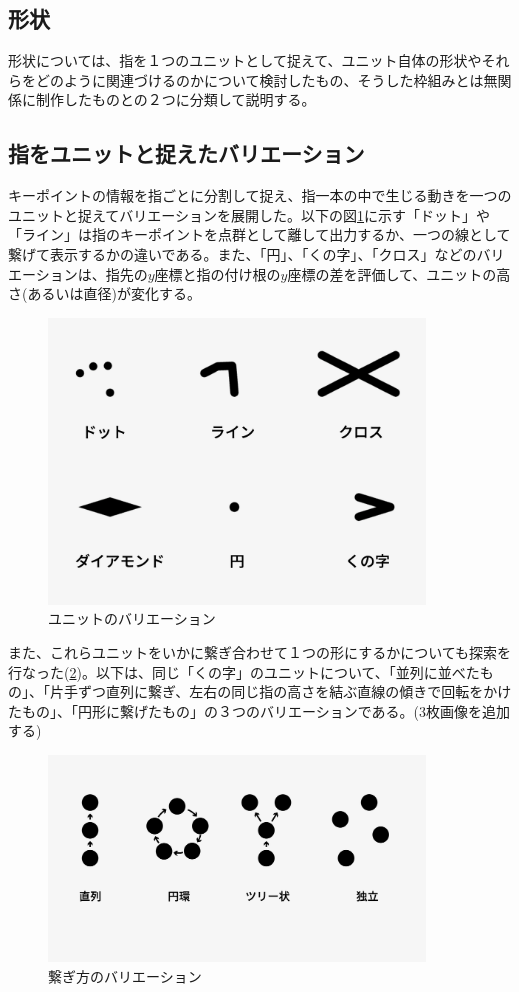 \subsection{形状}
形状については、指を１つのユニットとして捉えて、ユニット自体の形状やそれらをどのように関連づけるのかについて検討したもの、そうした枠組みとは無関係に制作したものとの２つに分類して説明する。
\subsection*{指をユニットと捉えたバリエーション}
キーポイントの情報を指ごとに分割して捉え、指一本の中で生じる動きを一つのユニットと捉えてバリエーションを展開した。以下の図\ref{fig:unit_valiation}に示す「ドット」や「ライン」は指のキーポイントを点群として離して出力するか、一つの線として繋げて表示するかの違いである。また、「円」、「くの字」、「クロス」などのバリエーションは、指先の\(y\)座標と指の付け根の\(y\)座標の差を評価して、ユニットの高さ(あるいは直径)が変化する。
\begin{figure}[H]
  \centering
  \includegraphics[width=10cm]{img/unit_valiation.png}
  \caption{ユニットのバリエーション}
  \label{fig:unit_valiation}
\end{figure}

また、これらユニットをいかに繋ぎ合わせて１つの形にするかについても探索を行なった(\ref{fig:connection_valiation})。以下は、同じ「くの字」のユニットについて、「並列に並べたもの」、「片手ずつ直列に繋ぎ、左右の同じ指の高さを結ぶ直線の傾きで回転をかけたもの」、「円形に繋げたもの」の３つのバリエーションである。(3枚画像を追加する)

\begin{figure}[H]
  \centering
  \includegraphics[width=10cm]{img/network.png}
  \caption{繋ぎ方のバリエーション}
  \label{fig:connection_valiation}
\end{figure}



